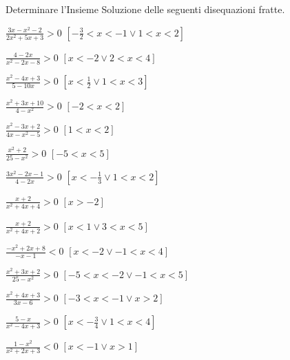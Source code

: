 \begin{esercizio}[\Ast]
 \label{ese:4.61}
Determinare l'Insieme Soluzione delle seguenti disequazioni fratte.
\begin{multicols}{2}
\begin{enumeratea}
\item $\frac{3x-x^2-2}{2x^2+5x+3}>0$ \hfill $\left[-\frac 3 2<x<-1\vee 1<x<2\right]$
\item $\frac{4-2x}{x^2-2x-8}>0$ \hfill $\left[x<-2\vee 2<x<4\right]$
\item $\frac{x^2-4x+3}{5-10x}>0$ \hfill $\left[x<\frac 1 2\vee 1<x<3\right]$
\item $\frac{x^2+3x+10}{4-x^2}>0$ \hfill $\left[-2<x<2\right]$
\item $\frac{x^2-3x+2}{4x-x^2-5}>0$ \hfill $\left[1<x<2\right]$
\item $\frac{x^2+2}{25-x^2}>0$ \hfill $\left[-5<x<5\right]$
\item $\frac{3x^2-2x-1}{4-2x}>0$ \hfill $\left[x<-\frac 1 3\vee 1<x<2\right]$
\item $\frac{x+2}{x^2+4x+4}>0$ \hfill $\left[x>-2\right]$
\item $\frac{x+2}{x^2+4x+2}>0$ \hfill $\left[x<1\vee 3<x<5\right]$
\item $\frac{-x^2+2x+8}{-x-1}<0$ \hfill $\left[x<-2\vee -1<x<4\right]$
\item $\frac{x^2+3x+2}{25-x^2}>0$ \hfill $\left[-5<x<-2\vee -1<x<5\right]$
\item $\frac{x^2+4x+3}{3x-6}>0$ \hfill $\left[-3<x<-1\vee x>2\right]$
\item $\frac{5-x}{x^2-4x+3}>0$ \hfill $\left[x<-\frac 3 4\vee 1<x<4\right]$
\item $\frac{1-x^2}{x^2+2x+3}<0$ \hfill $\left[x<-1\vee x>1\right]$
\end{enumeratea}
\end{multicols}
\end{esercizio}

